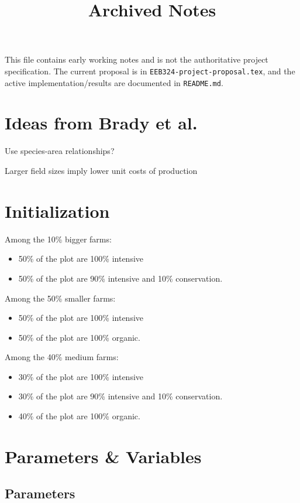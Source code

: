 \documentclass{article}
\title{Archived Notes}
\begin{document}
\maketitle

This file contains early working notes and is not the authoritative project specification. The current proposal is in \texttt{EEB324-project-proposal.tex}, and the active implementation/results are documented in \texttt{README.md}. \\

\section{Ideas from Brady et al.}

Use species-area relationships?

Larger field sizes imply lower unit costs of production

\section{Initialization}
Among the 10\% bigger farms: 
\begin{itemize}
    \item 50\% of the plot are 100\% intensive
    \item 50\% of the plot are 90\% intensive and 10\% conservation.
\end{itemize}

Among the 50\% smaller farms: 
\begin{itemize}
    \item 50\% of the plot are 100\% intensive
    \item 50\% of the plot are 100\% organic.
\end{itemize}

Among the 40\% medium farms:
\begin{itemize}
    \item 30\% of the plot are 100\% intensive
    \item 30\% of the plot are 90\% intensive and 10\% conservation.
    \item 40\% of the plot are 100\% organic.
\end{itemize}

\section{Parameters \& Variables}

\subsection{Parameters}
\end{document}
